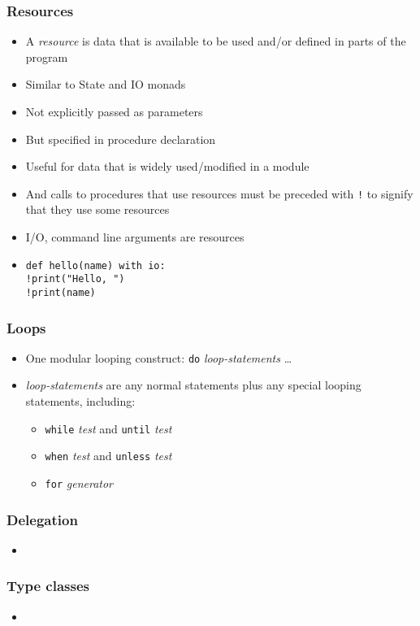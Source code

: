 \documentclass[12pt]{beamer}
\begin{document}
\begin{frame}
\frametitle{Resources}
\begin{itemize}
\item A \emph{resource} is data that is available to be used and/or
  defined in parts of the program
\item Similar to State and IO monads
\item Not explicitly passed as parameters
\item But specified in procedure declaration
\item Useful for data that is widely used/modified in a module
\item And calls to procedures that use resources must be preceded with
  \texttt{!} to signify that they use some resources
\item I/O, command line arguments are resources
\item \texttt{def hello(name) with io:} \\
\hspace*{2em}\texttt{!print("Hello, ")} \\
\hspace*{2em}\texttt{!print(name)} \\
\end{itemize}
\end{frame}


\begin{frame}
\frametitle{Loops}
\begin{itemize}
\item One modular looping construct: \texttt{do} \emph{loop-statements} \ldots
\item \emph{loop-statements} are any normal statements plus any
  special looping statements, including:
  \begin{itemize}
  \item \texttt{while} \emph{test} and \texttt{until} \emph{test}
  \item \texttt{when} \emph{test} and \texttt{unless} \emph{test}
  \item \texttt{for} \emph{generator}
  \end{itemize}
\end{itemize}
\end{frame}


\begin{frame}
\frametitle{Delegation}
\begin{itemize}
\item 
\end{itemize}
\end{frame}


\begin{frame}
\frametitle{Type classes}
\begin{itemize}
\item 
\end{itemize}
\end{frame}
\end{document}
